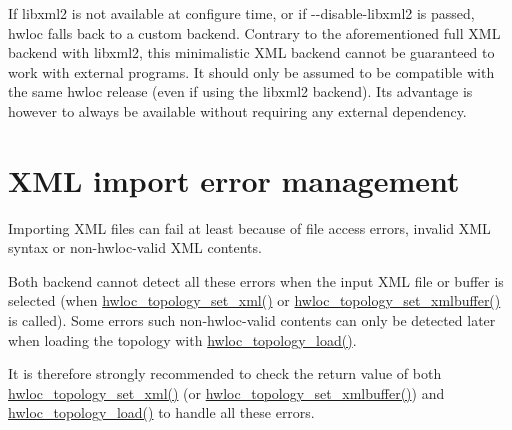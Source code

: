 If libxml2 is not available at configure time, or if {\ttfamily -\/-\/disable-\/libxml2} is passed, hwloc falls back to a custom backend. Contrary to the aforementioned full XML backend with libxml2, this minimalistic XML backend cannot be guaranteed to work with external programs. It should only be assumed to be compatible with the same hwloc release (even if using the libxml2 backend). Its advantage is however to always be available without requiring any external dependency.\hypertarget{a00007_xml_errors}{}\section{XML import error management}\label{a00007_xml_errors}
Importing XML files can fail at least because of file access errors, invalid XML syntax or non-\/hwloc-\/valid XML contents.

Both backend cannot detect all these errors when the input XML file or buffer is selected (when \hyperlink{a00044_ga93efcc8a962afe1ed23393700682173f}{hwloc\_\-topology\_\-set\_\-xml()} or \hyperlink{a00044_gae7e4bade144652a2b48f5eaf0309b4ec}{hwloc\_\-topology\_\-set\_\-xmlbuffer()} is called). Some errors such non-\/hwloc-\/valid contents can only be detected later when loading the topology with \hyperlink{a00043_ga91e2e6427b95fb7339c99dbbef996e71}{hwloc\_\-topology\_\-load()}.

It is therefore strongly recommended to check the return value of both \hyperlink{a00044_ga93efcc8a962afe1ed23393700682173f}{hwloc\_\-topology\_\-set\_\-xml()} (or \hyperlink{a00044_gae7e4bade144652a2b48f5eaf0309b4ec}{hwloc\_\-topology\_\-set\_\-xmlbuffer()}) and \hyperlink{a00043_ga91e2e6427b95fb7339c99dbbef996e71}{hwloc\_\-topology\_\-load()} to handle all these errors. 
